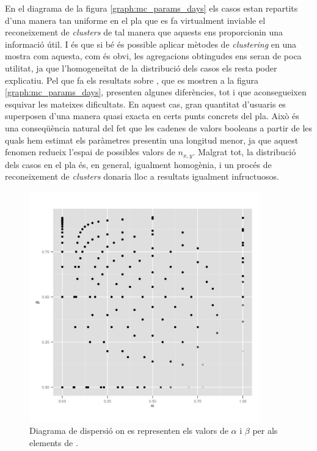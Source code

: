\documentclass[
	a4paper,
	twoside,
	justified
]{tufte-book}
\begin{document}
En el diagrama de la figura \ref{graph:mc_params_days} els casos estan repartits d'una manera tan uniforme en el pla que es fa virtualment inviable el reconeixement de \emph{clusters} de tal manera que aquests ens proporcionin una informació útil. I és que si bé és possible aplicar mètodes de \emph{clustering} en una mostra com aquesta, com és obvi, les agregacions obtingudes ens seran de poca utilitat, ja que l'homogeneïtat de la distribució dels casos els resta poder explicatiu. Pel que fa els resultats sobre , que es mostren a la figura \ref{graph:mc_params_days}, presenten algunes diferències, tot i que aconsegueixen esquivar les mateixes dificultats. En aquest cas, gran quantitat d'usuaris es superposen d'una manera quasi exacta en certs punts concrets del pla. Això és una conseqüència natural del fet que les cadenes de valors booleans a partir de les quals hem estimat els paràmetres presentin una longitud menor, ja que aquest fenomen redueix l'espai de possibles valors de $n_{x,y}$. Malgrat tot, la distribució dels casos en el pla és, en general, igualment homogènia, i un procés de reconeixement de \emph{clusters} donaria lloc a resultats igualment infructuosos.            
 
\begin{figure}
\begin{center}
\includegraphics[width=10cm]{mc_params_weeks}
\caption{
\label{graph:mc_params_weeks}
	Diagrama de dispersió on es representen els valors de $\alpha$ i $\beta$ per als elements de . 
}
\end{center}
\end{figure}
\end{document}
